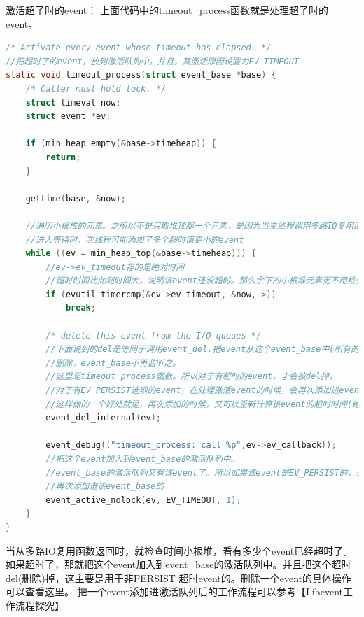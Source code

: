 \documentclass[11pt,a4paper]{article}
\begin{document}
激活超了时的event：
        上面代码中的timeout\_process函数就是处理超了时的event。

\begin{lstlisting}[language=C]
/* Activate every event whose timeout has elapsed. */
//把超时了的event，放到激活队列中。并且，其激活原因设置为EV_TIMEOUT
static void timeout_process(struct event_base *base) {
	/* Caller must hold lock. */
	struct timeval now;
	struct event *ev;

	if (min_heap_empty(&base->timeheap)) {
		return;
	}

	gettime(base, &now);

	//遍历小根堆的元素。之所以不是只取堆顶那一个元素，是因为当主线程调用多路IO复用函数
	//进入等待时，次线程可能添加了多个超时值更小的event
	while ((ev = min_heap_top(&base->timeheap))) {
		//ev->ev_timeout存的是绝对时间
		//超时时间比此刻时间大，说明该event还没超时。那么余下的小根堆元素更不用检查了。
		if (evutil_timercmp(&ev->ev_timeout, &now, >))
			break;

		/* delete this event from the I/O queues */
		//下面说到的del是等同于调用event_del.把event从这个event_base中(所有的队列都)
		//删除。event_base不再监听之。
		//这里是timeout_process函数。所以对于有超时的event，才会被del掉。
		//对于有EV_PERSIST选项的event，在处理激活event的时候，会再次添加进event_base的。
		//这样做的一个好处就是，再次添加的时候，又可以重新计算该event的超时时间(绝对时间)。
		event_del_internal(ev);

		event_debug(("timeout_process: call %p",ev->ev_callback));
		//把这个event加入到event_base的激活队列中。
		//event_base的激活队列又有该event了。所以如果该event是EV_PERSIST的，是可以
		//再次添加进该event_base的
		event_active_nolock(ev, EV_TIMEOUT, 1);
	}
}
\end{lstlisting}
当从多路IO复用函数返回时，就检查时间小根堆，看有多少个event已经超时了。如果超时了，那就把这个event加入到event\_base的激活队列中。并且把这个超时del(删除)掉，这主要是用于非PERSIST 超时event的。删除一个event的具体操作可以查看这里。
把一个event添加进激活队列后的工作流程可以参考【Libevent工作流程探究】
\end{document}
